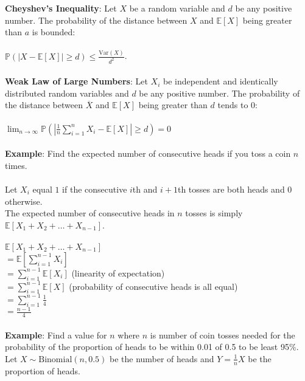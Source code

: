 \documentclass{article}
\begin{document}
			\textbf{Cheyshev's Inequality}: Let $X$ be a random variable and $d$ be any positive number. The probability of the distance between $X$ and $\mathbb{E}[X]$ being greater than $a$ is bounded: \\
			\\
			$\mathbb{P}(|X - \mathbb{E}[X]| \geq d) \leq \frac{\text{Var}(X)}{d^2}$. \\
			\\
			\textbf{Weak Law of Large Numbers}: Let $X_i$ be independent and identically distributed random variables and $d$ be any positive number. The probability of the distance between $\overline{X}$ and $\mathbb{E}[X]$ being greater than $d$ tends to $0$: \\
			\\
			$\lim_{n \to \infty} \mathbb{P}(|\frac{1}{n} \sum_{i = 1}^n X_i - \mathbb{E}[X]| \geq d) = 0$ \\
			\\
			\textbf{Example}: Find the expected number of consecutive heads if you toss a coin $n$ times. \\
			\\
			\textbullet \; Let $X_i$ equal $1$ if the consecutive $i$th and $i+1$th tosses are both heads and $0$ otherwise. \\
			\textbullet \; The expected number of consecutive heads in $n$ tosses is simply $\mathbb{E}[X_1 + X_2 + \ldots + X_{n-1}]$.\\
			\\
			$\mathbb{E}[X_1 + X_2 + \ldots + X_{n-1}]$ \\
			$= \mathbb{E}[\sum_{i=1}^{n-1} X_i]$ \\
			$= \sum_{i=1}^{n-1} \mathbb{E}[X_i]$ (linearity of expectation) \\
			$= \sum_{i=1}^{n-1} \mathbb{E}[X]$ (probability of consecutive heads is all equal) \\
			$= \sum_{i=1}^{n-1} \frac{1}{4}$ \\
			$= \frac{n-1}{4}$ \\
			\\
			\textbf{Example}: Find a value for $n$ where $n$ is number of coin tosses needed for the probability of the proportion of heads to be within 0.01 of 0.5 to be least 95\%. Let $X \sim \text{Binomial}(n, 0.5)$ be the number of heads and $Y = \frac{1}{n} X$ be the proportion of heads. \\
			\\
\end{document}
